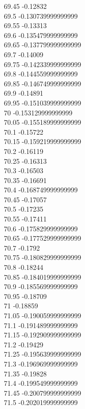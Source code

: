 {69.45	-0.12832\\
69.5	-0.130739999999999\\
69.55	-0.13313\\
69.6	-0.135479999999999\\
69.65	-0.137799999999999\\
69.7	-0.14009\\
69.75	-0.142339999999999\\
69.8	-0.144559999999999\\
69.85	-0.146749999999999\\
69.9	-0.14891\\
69.95	-0.151039999999999\\
70	-0.153129999999999\\
70.05	-0.155189999999999\\
70.1	-0.15722\\
70.15	-0.159219999999999\\
70.2	-0.16119\\
70.25	-0.16313\\
70.3	-0.16503\\
70.35	-0.16691\\
70.4	-0.168749999999999\\
70.45	-0.17057\\
70.5	-0.17235\\
70.55	-0.17411\\
70.6	-0.175829999999999\\
70.65	-0.177529999999999\\
70.7	-0.1792\\
70.75	-0.180829999999999\\
70.8	-0.18244\\
70.85	-0.184019999999999\\
70.9	-0.185569999999999\\
70.95	-0.18709\\
71	-0.18859\\
71.05	-0.190059999999999\\
71.1	-0.191489999999999\\
71.15	-0.192909999999999\\
71.2	-0.19429\\
71.25	-0.195639999999999\\
71.3	-0.196969999999999\\
71.35	-0.19828\\
71.4	-0.199549999999999\\
71.45	-0.200799999999999\\
71.5	-0.202019999999999\\
}
